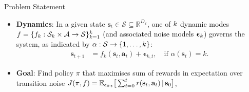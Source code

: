 \documentclass[final,11pt]{beamer}
\newlength{\colwidth}
\newcommand{\E}{\mathbb{E}}    %
\newcommand{\R}{\mathbb{R}}    %
\renewcommand{\mid}{\,|\,}
\DeclareMathOperator{\R}{\mathbb{R}}
\DeclareMathOperator{\E}{\mathbb{E}}
\newcommand{\modeInd}{\ensuremath{k}}
\newcommand{\StateDim}{\ensuremath{{D_x}}}
\newcommand{\ControlDim}{\ensuremath{{D_u}}}
\newcommand{\ModeInd}{\ensuremath{\MakeUppercase{\modeInd}}}
\newcommand{\mode}[1]{\ensuremath{#1_{\modeInd}}}
\newcommand{\state}{\ensuremath{\mathbf{x}}}
\newcommand{\control}{\ensuremath{\mathbf{u}}}
\newcommand{\modeVar}{\ensuremath{\alpha}}
\newcommand{\timeInd}{\ensuremath{t}}
\newcommand{\TimeInd}{\ensuremath{\MakeUppercase{\timeInd}}}
\newcommand{\dynamicsFunc}{\ensuremath{f}}
\newcommand{\desiredMode}{\ensuremath{\modeInd^{*}}}
\newcommand{\stateDomain}{\ensuremath{\mathcal{S}}}
\newcommand{\controlDomain}{\ensuremath{\mathcal{A}}}
\renewcommand{\state}{\ensuremath{\mathbf{s}}}
\renewcommand{\mode}[1]{\ensuremath{#1_{\modeInd}}}
\renewcommand{\control}{\ensuremath{\mathbf{a}}}
\newcommand{\rewardFunc}{\ensuremath{r}}
\begin{document}
\begin{frame}[t]
\begin{columns}[t]
\begin{column}{\colwidth}
\begin{block}{Problem Statement}
    \begin{itemize}
        \item \textbf{Dynamics}: In a given state $\state_t \in \stateDomain \subseteq \R^{\StateDim}$, one of $\color{black}{\ModeInd}$ \textcolor{black}{dynamic modes}
      $\dynamicsFunc = \{\mode{\dynamicsFunc} : \mode{\stateDomain} \times \controlDomain \rightarrow \stateDomain \}_{\modeInd=1}^{\ModeInd}$ \textcolor{black}{(and associated noise models} $\color{black}{\bm\epsilon_{\modeInd}}$) governs the system, as
            indicated by $\color{black}{\alpha: \stateDomain \rightarrow \{1,\ldots, \ModeInd\}}$:
          \begin{align} \label{eq-dynamics}
          \state_{\timeInd+1}
          &= \mode{\dynamicsFunc}(\state_\timeInd, \control_\timeInd) + \bm\epsilon_{\modeInd, \timeInd},
          \quad\text{if } \modeVar(\state_{\timeInd}) = \modeInd.
          \end{align}
      \item \textbf{Goal}:
      Find policy $\pi$ that maximises sum of rewards in expectation over transition noise
      $J(\pi, \dynamicsFunc) = \E_{\bm\epsilon_{0:\TimeInd}} \big[ \sum_{\timeInd=0}^{\TimeInd} \rewardFunc(\state_{\timeInd}, \control_{\timeInd}) \mid \state_0 \big]$,

\end{itemize}
\end{block}
\end{column}
\end{columns}
\end{frame}
\end{document}

